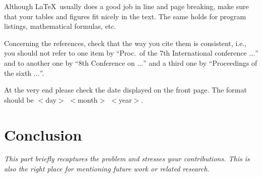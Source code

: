 \documentclass{howto}
\begin{document}
Although \LaTeX\ usually does a good job in line and page breaking, make
sure that your tables and figures fit nicely in the text. The same holds
for program listings, mathematical formulas, etc.

Concerning the references,
check that the way you cite them is consistent, i.e., you should not refer
to one item by ``Proc.\ of the 7th International conference $\ldots$'' and to
another one by ``8th Conference on $\ldots$'' and a third one by
``Proceedings of the sixth $\ldots$''.

At the very end please check the date displayed on the front page. The
format should be $<$day$>$ $<$month$>$ $<$year$>$.

\section{Conclusion}
\label{CON:main}
\emph{This part briefly recaptures the problem and stresses your
contributions. This is also the right place for mentioning future
work or related research.}
\end{document}
